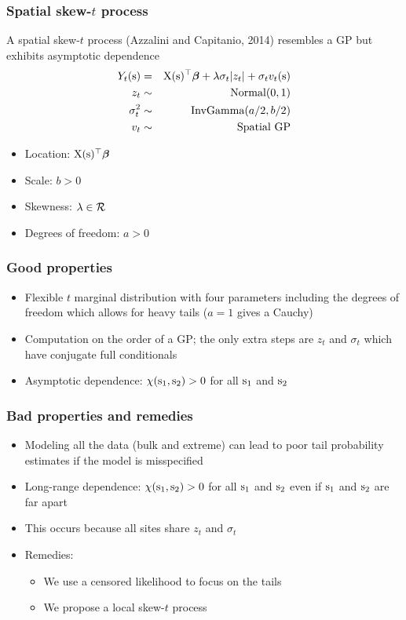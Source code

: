 \documentclass{beamer}
\newcommand{\bbeta}{ \mbox{\boldmath $\beta$}}
\newcommand{\bX}{ \mbox{\boldmath X}}
\renewcommand{\bs}{ \mbox{\boldmath s}}
\newcommand{\skewt}{skew-$t$ }
\newcommand{\bit}{\begin{itemize}}
\newcommand{\eit}{\end{itemize}}
\begin{document}
\begin{frame}\frametitle{Spatial \skewt process}
  A spatial \skewt process (Azzalini and Capitanio, 2014)  resembles a GP but exhibits asymptotic dependence
 \begin{eqnarray}
 Y_t(\bs) &=& \bX(\bs)^\top\bbeta +\lambda\sigma_t|z_t| + \sigma_tv_t(\bs)\nonumber\\
 z_t &\sim& \mbox{Normal}(0,1)\nonumber\\
\sigma_t^2&\sim& \mbox{InvGamma}(a/2,b/2)\nonumber\\
v_t&\sim& \mbox{Spatial GP}\nonumber
 \end{eqnarray}
  \bit\setlength\itemsep{\fill}
  \item Location: $\bX(\bs)^\top\bbeta$
  \item Scale: $b>0$
  \item Skewness: $\lambda\in{\cal R}$
  \item Degrees of freedom: $a>0$
  \eit
\end{frame}



\begin{frame}\frametitle{Good properties}
  \bit\setlength\itemsep{\fill}
  \item Flexible $t$ marginal distribution with four parameters including the degrees of freedom which allows for heavy tails ($a=1$ gives a Cauchy)
  \item Computation on the order of a GP; the only extra steps are $z_t$ and $\sigma_t$ which have conjugate full conditionals
  \item Asymptotic dependence: $\chi(\bs_1,\bs_2)>0$ for all $\bs_1$ and $\bs_2$
  \eit
\end{frame}

\begin{frame}\frametitle{Bad properties and remedies}
  \bit\setlength\itemsep{1em}
  \item Modeling all the data (bulk and extreme) can lead to poor tail probability estimates if the model is misspecified
  \item Long-range dependence: $\chi(\bs_1,\bs_2)>0$ for all $\bs_1$ and $\bs_2$ even if $\bs_1$ and $\bs_2$ are far apart
  \item This occurs because all sites share $z_t$ and $\sigma_t$
  \item Remedies:
  \bit
    \item We use a censored likelihood to focus on the tails
    \item We propose a local \skewt process
  \eit
  \eit
\end{frame}
\end{document}
